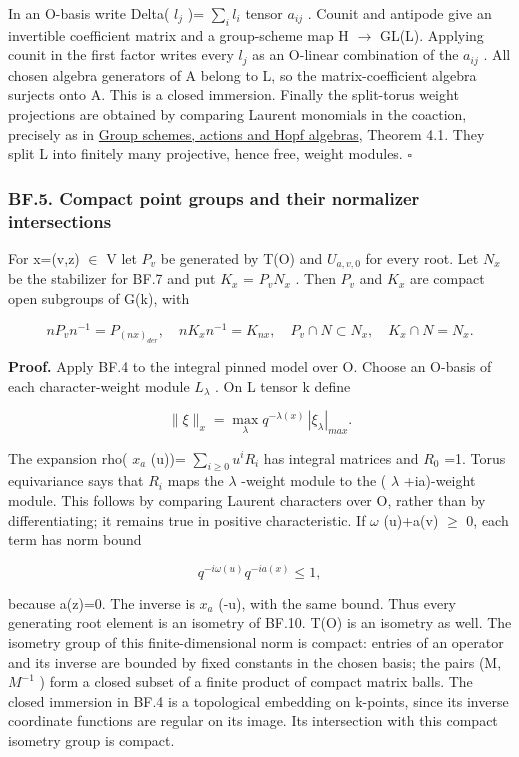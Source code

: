 \documentclass[
  11pt,
]{article}
\begin{document}
In an O-basis write Delta( \(l_{j}\) )= \(\sum_{i} l_{i}\) tensor
\(a_{ij}\) . Counit and antipode give an invertible coefficient matrix
and a group-scheme map H \(\to\) GL(L). Applying counit in the first
factor writes every \(l_{j}\) as an O-linear combination of the
\(a_{ij}\) . All chosen algebra generators of A belong to L, so the
matrix-coefficient algebra surjects onto A. This is a closed immersion.
Finally the split-torus weight projections are obtained by comparing
Laurent monomials in the coaction, precisely as in
\href{../AG-GS/AG-GS-01.html}{Group schemes, actions and Hopf algebras},
Theorem 4.1. They split L into finitely many projective, hence free,
weight modules. \(\square\)

\subsubsection{BF.5. Compact point groups and their normalizer
intersections}\label{bf.5.-compact-point-groups-and-their-normalizer-intersections}

For x=(v,z) \(\in\) V let \(P_{v}\) be generated by T(O) and
\(U_{a,v,0}\) for every root. Let \(N_{x}\) be the stabilizer for BF.7
and put \(K_{x}\) = \(P_{v} N_{x}\) . Then \(P_{v}\) and \(K_{x}\) are
compact open subgroups of G(k), with

\[
 nP_vn^{-1}=P_{(nx)_{der}},\quad nK_xn^{-1}=K_{nx},
 \quad P_v\cap N\subset N_x,\quad K_x\cap N=N_x.
 \tag{BF.9}
\]

\textbf{Proof.} Apply BF.4 to the integral pinned model over O. Choose
an O-basis of each character-weight module \(L_{\lambda}\) . On L tensor
k define

\[
 \|\xi\|_x=\max_\lambda q^{-\lambda(x)}\,|\xi_\lambda|_{max}.
 \tag{BF.10}
\]

The expansion rho( \(x_{a}\) (u))= \(\sum_{i\ge 0} u^i R_{i}\) has
integral matrices and \(R_{0}\) =1. Torus equivariance says that
\(R_{i}\) maps the \(\lambda\) -weight module to the ( \(\lambda\)
+ia)-weight module. This follows by comparing Laurent characters over O,
rather than by differentiating; it remains true in positive
characteristic. If \(\omega\) (u)+a(v) \(\ge\) 0, each term has norm
bound

\[
 q^{-i\omega(u)}q^{-ia(x)}\le1,
\]

because a(z)=0. The inverse is \(x_{a}\) (-u), with the same bound. Thus
every generating root element is an isometry of BF.10. T(O) is an
isometry as well. The isometry group of this finite-dimensional norm is
compact: entries of an operator and its inverse are bounded by fixed
constants in the chosen basis; the pairs (M, \(M^{-1}\) ) form a closed
subset of a finite product of compact matrix balls. The closed immersion
in BF.4 is a topological embedding on k-points, since its inverse
coordinate functions are regular on its image. Its intersection with
this compact isometry group is compact.
\end{document}
